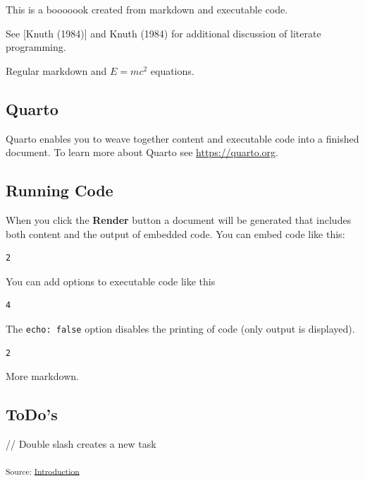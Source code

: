 \documentclass[11pt,a4paper]{report}
\begin{document}
This is a booooook created from markdown and executable code.

See {[}Knuth (1984){]} and Knuth (1984) for additional discussion of
literate programming.

Regular markdown and \(E=mc^2\) equations.

\subsection{Quarto}\label{quarto}

Quarto enables you to weave together content and executable code into a
finished document. To learn more about Quarto see
\url{https://quarto.org}.

\subsection{Running Code}\label{running-code}

When you click the \textbf{Render} button a document will be generated
that includes both content and the output of embedded code. You can
embed code like this:

\begin{verbatim}
2
\end{verbatim}

You can add options to executable code like this

\begin{verbatim}
4
\end{verbatim}

The \texttt{echo:\ false} option disables the printing of code (only
output is displayed).

\begin{verbatim}
2
\end{verbatim}

More markdown.

\subsection{ToDo's}\label{todos}

// Double slash creates a new task

\textsubscript{Source:
\href{https://VJMeyer.github.io/submission/chapters/section1-preview.html\#5c9cd77a-e4ad-4e45-8208-7fc2a66e21c3}{Introduction}}
\end{document}
